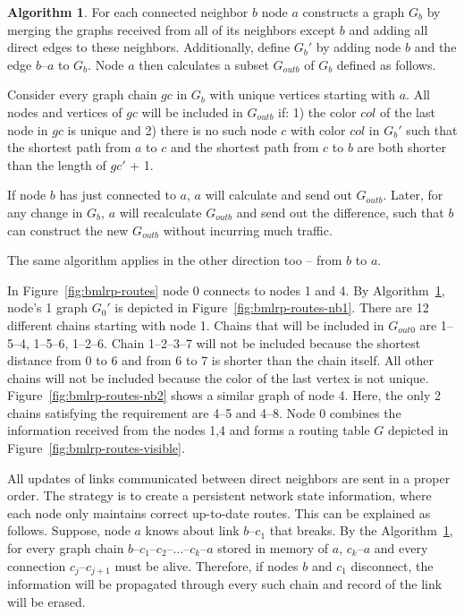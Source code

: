 \documentclass[14pt]{extarticle}
\theoremstyle{definition}
\newtheorem{algo}{Algorithm}
\begin{document}
\begin{samepage}
\begin{algo}
    For each connected neighbor $b$ node $a$ constructs a graph $G_b$ by merging the graphs received from all of its neighbors except $b$ and adding all direct edges to these neighbors. Additionally, define $G_b'$ by adding node $b$ and the edge $b$--$a$ to $G_b$. Node $a$ then calculates a subset $G_{outb}$ of $G_b$ defined as follows.

    Consider every graph chain $gc$ in $G_b$ with unique vertices starting with $a$. All nodes and vertices of $gc$ will be included in $G_{outb}$ if: 1) the color $col$ of the last node in $gc$ is unique and 2) there is no such node $c$ with color $col$ in $G_b'$ such that the shortest path from $a$ to $c$ and the shortest path from $c$ to $b$ are both shorter than the length of $gc'$ + 1.

    If node $b$ has just connected to $a$, $a$ will calculate and send out $G_{outb}$. Later, for any change in $G_b$, $a$ will recalculate $G_{outb}$ and send out the difference, such that $b$ can construct the new $G_{outb}$ without incurring much traffic.

    The same algorithm applies in the other direction too -- from $b$ to $a$.

    \label{alg:routes}
\end{algo}
\end{samepage}

In Figure~\ref{fig:bmlrp-routes} node 0 connects to nodes 1 and 4. By Algorithm~\ref{alg:routes}, node's 1 graph $G_0'$ is depicted in Figure~\ref{fig:bmlrp-routes-nb1}. There are 12 different chains starting with node 1. Chains that will be included in $G_{out0}$ are 1--5--4, 1--5--6, 1--2--6. Chain 1--2--3--7 will not be included because the shortest distance from 0 to 6 and from 6 to 7 is shorter than the chain itself. All other chains will not be included because the color of the last vertex is not unique. Figure~\ref{fig:bmlrp-routes-nb2} shows a similar graph of node 4. Here, the only 2 chains satisfying the requirement are 4--5 and 4--8. Node 0 combines the information received from the nodes 1,4 and forms a routing table $G$ depicted in Figure~\ref{fig:bmlrp-routes-visible}.



All updates of links communicated between direct neighbors are sent in a proper order. The strategy is to create a persistent network state information, where each node only maintains correct up-to-date routes. This can be explained as follows. Suppose, node $a$ knows about link $b$--$c_1$ that breaks. By the Algorithm~\ref{alg:routes}, for every graph chain $b$--$c_1$--$c_2$--...--$c_k$--$a$ stored in memory of $a$, $c_k$--$a$ and every connection $c_j$--$c_{j+1}$ must be alive. Therefore, if nodes $b$ and $c_1$ disconnect, the information will be propagated through every such chain and record of the link will be erased.
\end{document}
